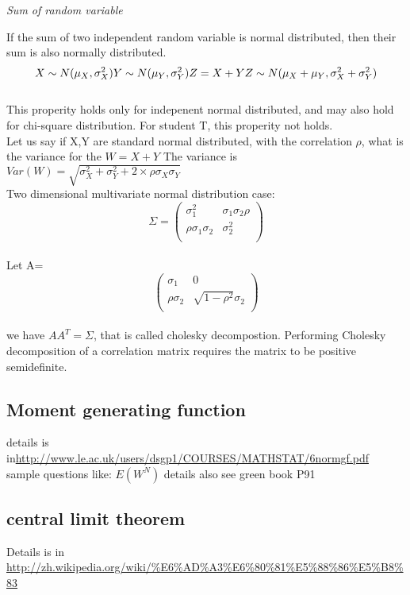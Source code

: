 \documentclass[a4paper,11pt]{article}
\begin{document}
\begin{centering}
\em {Sum of random variable\\}
\end{centering}
If the sum of two independent random variable is normal distributed, then their sum is also normally distributed.
$$
X\sim N(\mu_X,\sigma^2_X) \\
Y\sim N(\mu_Y,\sigma^2_Y)\\
Z=X+Y\\
Z \sim N(\mu_X+\mu_Y,\sigma^2_X+\sigma^2_Y)
$$\\
This properity holds only for indepenent normal distributed, and may also hold for chi-square distribution. For student T, this properity not holds.\\
Let us say if X,Y are standard normal distributed, with the correlation $\rho$, what is the variance for the $W=X+Y$
The variance is $Var(W)=\sqrt{\sigma_X^2+\sigma_Y^2+2\times\rho\sigma_X\sigma_Y}$\\
Two dimensional multivariate normal distribution case:\\
$$ \Sigma=
\begin{pmatrix}
  \sigma_1^2 & \sigma_1\sigma_2\rho  \\
  \rho\sigma_1\sigma_2  &\sigma_2^2    \\
 \end{pmatrix}$$\\
 Let
 A=
 $$
 \begin{pmatrix}
 \sigma_1 & 0     \\
 \rho\sigma_2 & \sqrt{1-\rho^2}\sigma_2\\
 \end{pmatrix} $$\\
 we have $AA^T=\Sigma$, that is called cholesky decompostion. Performing Cholesky decomposition of a correlation matrix requires the matrix to be positive semidefinite.
\subsection{Moment generating function}
details is in\url{http://www.le.ac.uk/users/dsgp1/COURSES/MATHSTAT/6normgf.pdf}\\
sample questions like: $E(W^N)$ details also see green book P91\\

\subsection{central limit theorem}
Details is in \url{http://zh.wikipedia.org/wiki/%E6%AD%A3%E6%80%81%E5%88%86%E5%B8%83}
\end{document}
